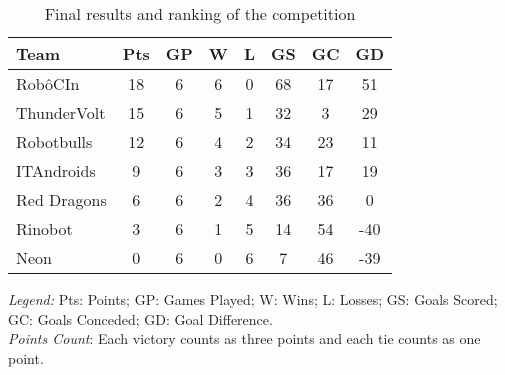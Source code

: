 \begin{table}[h]
    \begin{minipage}{\columnwidth}
        \begin{center}
            \begin{tabular}{l c c c c c c c}
                \toprule
                Team        & Pts & GP & W & L & GS & GC & GD  \\
                \midrule
                RobôCIn     & 18  & 6  & 6 & 0 & 68 & 17 & 51  \\
                ThunderVolt & 15  & 6  & 5 & 1 & 32 & 3  & 29  \\
                Robotbulls  & 12  & 6  & 4 & 2 & 34 & 23 & 11  \\
                ITAndroids  & 9   & 6  & 3 & 3 & 36 & 17 & 19  \\
                Red Dragons & 6   & 6  & 2 & 4 & 36 & 36 & 0   \\
                Rinobot     & 3   & 6  & 1 & 5 & 14 & 54 & -40 \\
                Neon        & 0   & 6  & 0 & 6 & 7  & 46 & -39 \\
                \bottomrule
            \end{tabular}
        \end{center}
        \begin{center}
            \footnotesize
            \emph{Legend:} Pts: Points; GP: Games Played; W: Wins; L: Losses; GS: Goals Scored; \\GC: Goals Conceded; GD: Goal Difference.\\
            \emph{Points Count}: Each victory counts as three points and each tie counts as one point.
        \end{center}
    \end{minipage}
    \caption{Final results and ranking of the competition \cite{ResultsIRONCup2023}}
    \label{tab:ironcup_results}
\end{table}
